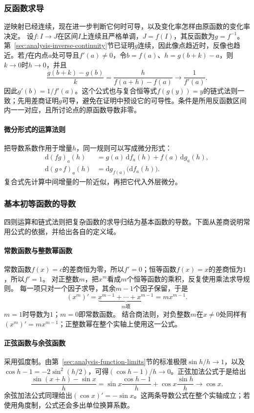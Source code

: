 \subsubsection{反函数求导}
逆映射已经连续，现在进一步判断它何时可导，以及变化率怎样由原函数的变化率决定。
设$f:I\to J$在区间$I$上连续且严格单调，$J=f(I)$，其反函数为$g=f^{-1}$。第~\ref{sec:analysis-inverse-continuity}节已证明$g$连续，因此像点趋近时，反像也趋近。若$f$在内点$a$处可导且$f'(a)\neq0$，令$b=f(a)$、$h=g(b+k)-a$，则$k\to0$时$h\to0$，并且
\[
 \frac{g(b+k)-g(b)}k
 =\frac{h}{f(a+h)-f(a)}\longrightarrow\frac1{f'(a)}.
\]
因此$g'(b)=1/f'(a)$。这个公式也与复合恒等式$f(g(y))=y$的链式法则一致；先用差商证明$g$可导，避免在证明中预设它的可导性。条件是所用反函数区间内一一对应，且所讨论点的原函数导数非零。

\paragraph{微分形式的运算法则}
把导数系数作用于增量$h$，同一规则可以写成微分形式：
\[
 \begin{aligned}
 \mathrm d(fg)_a(h)&=g(a)\,\mathrm df_a(h)+f(a)\,\mathrm dg_a(h),\\
 \mathrm d(g\circ f)_a(h)&=\mathrm dg_{f(a)}\bigl(\mathrm df_a(h)\bigr).
 \end{aligned}
\]
复合式先计算中间增量的一阶近似，再把它代入外层微分。

\subsubsection{基本初等函数的导数}
\label{sec:analysis-elementary-derivatives}

四则运算和链式法则把复杂函数的求导归结为基本函数的导数。下面从差商说明常用公式的依据，并给出各自的定义域。

\paragraph{常数函数与整数幂函数}
常数函数$f(x)=c$的差商恒为零，所以$f'=0$；恒等函数$f(x)=x$的差商恒为$1$，所以$f'=1$。
对正整数$m$，把$x^m$看成$m$个恒等函数的乘积，反复使用乘法求导规则。
每一项只对一个因子求导，其余$m-1$个因子保留，于是
\[
 (x^m)'=\underbrace{x^{m-1}+\cdots+x^{m-1}}_{m\text{项}}=mx^{m-1}.
\]
$m=1$时导数为$1$；$m=0$即常数函数。
结合商法则，对负整数$m$在$x\neq0$处同样有$(x^m)'=mx^{m-1}$；正整数幂在整个实轴上使用这一公式。

\paragraph{正弦函数与余弦函数}
采用弧度制。由第~\ref{sec:analysis-function-limits}节的标准极限$\sin h/h\to1$，以及$\cos h-1=-2\sin^2(h/2)$，可得$(\cos h-1)/h\to0$。正弦加法公式于是给出
\[
 \frac{\sin(x+h)-\sin x}{h}
 =\sin x\frac{\cos h-1}{h}+\cos x\frac{\sin h}{h}
 \longrightarrow\cos x.
\]
余弦加法公式同理给出$(\cos x)'=-\sin x$。这两条导数公式在整个实轴成立；若使用角度制，公式还会多出单位换算系数。

